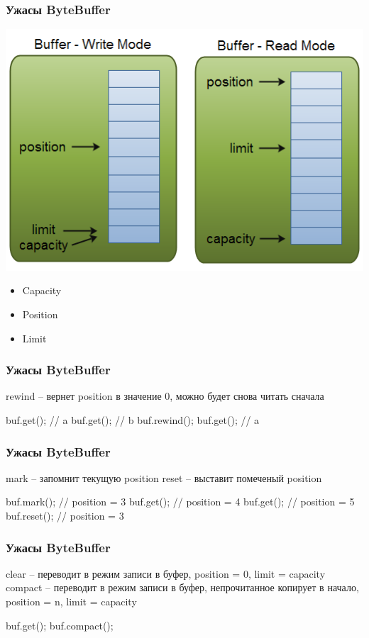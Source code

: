 \documentclass[russian,aspectratio=169,14pt]{beamer}
\begin{document}
\begin{frame}
	\frametitle{Ужасы ByteBuffer}
	\begin{minipage}{0.55\textwidth}
	\includegraphics[height=0.75\textheight]{byte_buffer.png}
	\end{minipage}
	\hfill
	\begin{minipage}{0.2\textwidth}
	\begin{itemize}
		\item Capacity
		\item Position
		\item Limit
	\end{itemize}
	\end{minipage}
\end{frame}

\begin{frame}[fragile]
	\frametitle{Ужасы ByteBuffer}
	rewind -- вернет position в значение 0, можно будет снова читать сначала
	\begin{listjava}
buf.get(); // a
buf.get(); // b
buf.rewind();
buf.get(); // a
	\end{listjava}
\end{frame}

\begin{frame}[fragile]
	\frametitle{Ужасы ByteBuffer}
	mark -- запомнит текущую position
	reset --  выставит помеченый position
	\begin{listjava}
buf.mark(); // position = 3
buf.get(); // position = 4
buf.get(); // position = 5
buf.reset(); // position = 3
	\end{listjava}
\end{frame}

\begin{frame}[fragile]
	\frametitle{Ужасы ByteBuffer}
	clear -- переводит в режим записи в буфер, position = 0, limit = capacity
	compact -- переводит в режим записи в буфер, непрочитанное копирует в начало, position = n, limit = capacity
	\begin{listjava}
buf.get();
buf.compact();
	\end{listjava}
\end{frame}
\end{document}

